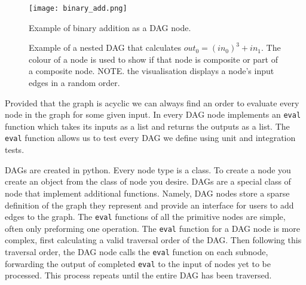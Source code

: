 \begin{figure}[h!]
    \begin{center}
        \texttt{[image: binary\_add.png]}
        \caption{Example of binary addition as a DAG node.}
        \label{fig:bin_add}
    \end{center}
\end{figure}

\begin{figure}[h!]
    \centering
    \hspace{1em}
    \caption{Example of a nested DAG that calculates $out_0 = (in_0)^3 + in_1$. The colour of a node is used to show if that node is composite or part of a composite node. NOTE. the visualisation displays a node's input edges in a random order.}\label{fig:bn}
\end{figure}

Provided that the graph is acyclic we can always find an order to evaluate every node in the graph for some given input.
In \phlat every DAG node implements an \texttt{eval} function which takes its inputs as a list and returns the outputs as a list.
The \texttt{eval} function allows us to test every DAG we define using unit and integration tests.

DAGs are created in python.
Every node type is a class.
To create a node you create an object from the class of node you desire.
DAGs are a special class of node that implement additional functions.
Namely, DAG nodes store a sparse definition of the graph they represent and provide an interface for users to add edges to the graph.
The \texttt{eval} functions of all the primitive nodes are simple, often only preforming one operation.
The \texttt{eval} function for a DAG node is more complex, first calculating a valid traversal order of the DAG.
Then following this traversal order, the DAG node calls the \texttt{eval} function on each subnode, forwarding the output of completed \texttt{eval} to the input of nodes yet to be processed.
This process repeats until the entire DAG has been traversed.

